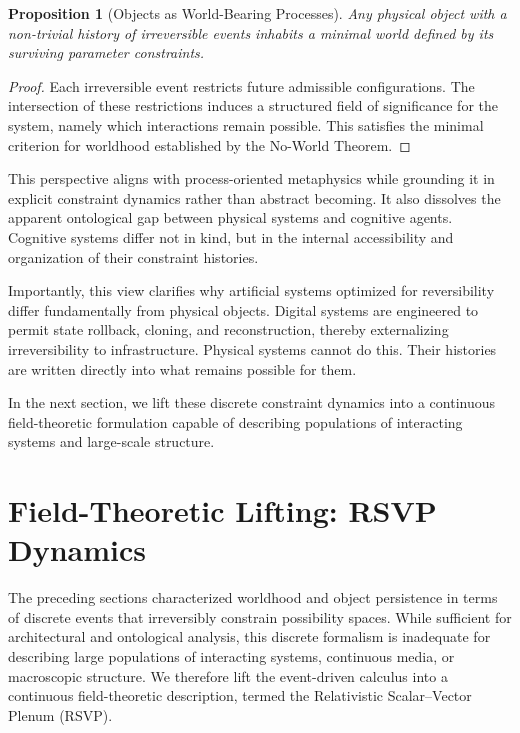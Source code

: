 \documentclass[11pt]{article}
\newtheorem{proposition}{Proposition}
\theoremstyle{remark}
\begin{document}
\begin{proposition}[Objects as World-Bearing Processes]
Any physical object with a non-trivial history of irreversible events inhabits a minimal world defined by its surviving parameter constraints.
\end{proposition}

\begin{proof}
Each irreversible event restricts future admissible configurations. The intersection of these restrictions induces a structured field of significance for the system, namely which interactions remain possible. This satisfies the minimal criterion for worldhood established by the No-World Theorem.
\end{proof}

This perspective aligns with process-oriented metaphysics while grounding it in explicit constraint dynamics rather than abstract becoming. It also dissolves the apparent ontological gap between physical systems and cognitive agents. Cognitive systems differ not in kind, but in the internal accessibility and organization of their constraint histories.

Importantly, this view clarifies why artificial systems optimized for reversibility differ fundamentally from physical objects. Digital systems are engineered to permit state rollback, cloning, and reconstruction, thereby externalizing irreversibility to infrastructure. Physical systems cannot do this. Their histories are written directly into what remains possible for them.

In the next section, we lift these discrete constraint dynamics into a continuous field-theoretic formulation capable of describing populations of interacting systems and large-scale structure.

\section{Field-Theoretic Lifting: RSVP Dynamics}

The preceding sections characterized worldhood and object persistence in terms of discrete events that irreversibly constrain possibility spaces. While sufficient for architectural and ontological analysis, this discrete formalism is inadequate for describing large populations of interacting systems, continuous media, or macroscopic structure. We therefore lift the event-driven calculus into a continuous field-theoretic description, termed the Relativistic Scalar--Vector Plenum (RSVP).
\end{document}
